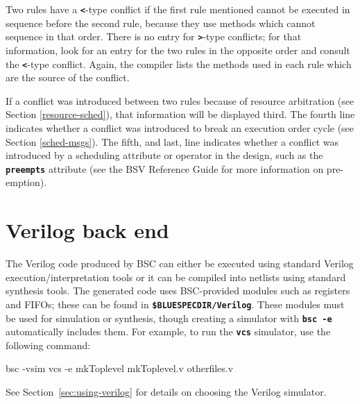 \documentclass{article}
\newcommand{\te}[1]{\texttt{#1}}
\newenvironment{centerboxverbatim}
  {\center
   \boxedverbatim}
  {\endboxedverbatim
  {\endcenter }}
\begin{document}
Two rules have a {\bf\tt <}-type conflict if the first rule mentioned
cannot be executed in sequence before the second rule, because they
use methods which cannot sequence in that order.  There is no entry
for {\bf\tt >}-type conflicts; for that information, look for an entry
for the two rules in the opposite order and consult the {\bf\tt <}-type
conflict.  Again, the compiler lists the methods used in each rule
which are the source of the conflict.

If a conflict was introduced between two rules because of resource
arbitration (see Section \ref{resource-sched}), that information will
be displayed third.  The fourth line indicates whether a conflict was
introduced to break an execution order cycle (see Section
\ref{sched-msgs}).  The fifth, and last, line indicates whether a
conflict was introduced by a scheduling attribute or operator in the
design, such as the {\bf\tt preempts} attribute (see the
BSV Reference Guide for more information on pre-emption).



\section{Verilog back end}
\label{sec-vl-back-end}
\index{.xcf@\te{.xcf} (synthesis script)}


The Verilog code produced by BSC can either be executed using
standard Verilog execution/interpretation tools or it can be compiled into
netlists using standard synthesis tools.  The generated code uses
BSC-provided modules such as registers and FIFOs; these can be found in
{\bf\tt \$BLUESPECDIR/Verilog}.  These modules must be used for simulation or
synthesis, though creating a simulator with {\bf\tt bsc -e} automatically
includes them.  For example, to run the {\bf\tt vcs} simulator, use the
following command:

\begin{centerboxverbatim}
bsc -vsim vcs -e mkToplevel mkToplevel.v otherfiles.v
\end{centerboxverbatim}

See Section~\ref{sec:using-verilog} for details on choosing the Verilog
simulator.

\end{document}
